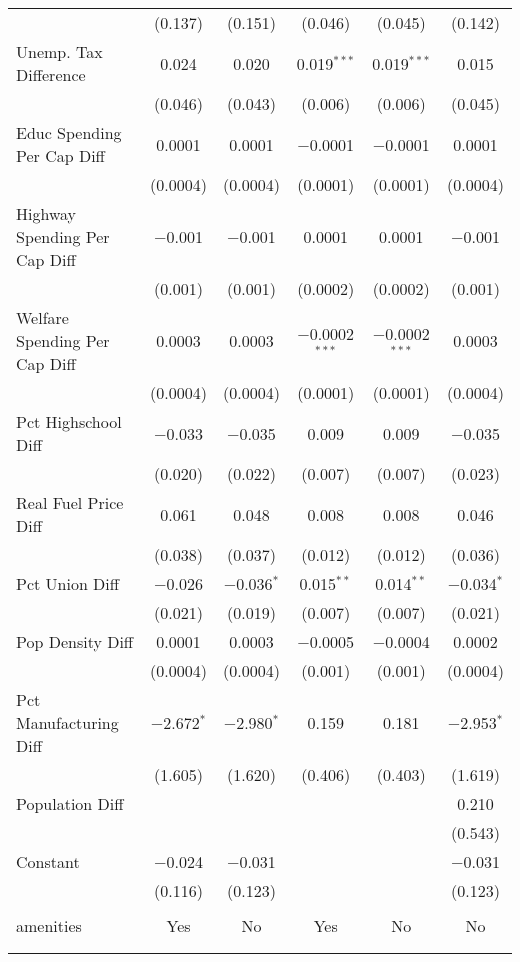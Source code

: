 \begin{table}[!htbp]
\begin{tabular}{@{\extracolsep{5pt}}lccccc}
  & (0.137) & (0.151) & (0.046) & (0.045) & (0.142) \\ 
  Unemp. Tax Difference & 0.024 & 0.020 & 0.019$^{***}$ & 0.019$^{***}$ & 0.015 \\ 
  & (0.046) & (0.043) & (0.006) & (0.006) & (0.045) \\ 
  Educ Spending Per Cap Diff & 0.0001 & 0.0001 & $-$0.0001 & $-$0.0001 & 0.0001 \\ 
  & (0.0004) & (0.0004) & (0.0001) & (0.0001) & (0.0004) \\ 
  Highway Spending Per Cap Diff & $-$0.001 & $-$0.001 & 0.0001 & 0.0001 & $-$0.001 \\ 
  & (0.001) & (0.001) & (0.0002) & (0.0002) & (0.001) \\ 
  Welfare Spending Per Cap Diff & 0.0003 & 0.0003 & $-$0.0002$^{***}$ & $-$0.0002$^{***}$ & 0.0003 \\ 
  & (0.0004) & (0.0004) & (0.0001) & (0.0001) & (0.0004) \\ 
  Pct Highschool Diff & $-$0.033 & $-$0.035 & 0.009 & 0.009 & $-$0.035 \\ 
  & (0.020) & (0.022) & (0.007) & (0.007) & (0.023) \\ 
  Real Fuel Price Diff & 0.061 & 0.048 & 0.008 & 0.008 & 0.046 \\ 
  & (0.038) & (0.037) & (0.012) & (0.012) & (0.036) \\ 
  Pct Union Diff & $-$0.026 & $-$0.036$^{*}$ & 0.015$^{**}$ & 0.014$^{**}$ & $-$0.034$^{*}$ \\ 
  & (0.021) & (0.019) & (0.007) & (0.007) & (0.021) \\ 
  Pop Density Diff & 0.0001 & 0.0003 & $-$0.0005 & $-$0.0004 & 0.0002 \\ 
  & (0.0004) & (0.0004) & (0.001) & (0.001) & (0.0004) \\ 
  Pct Manufacturing Diff & $-$2.672$^{*}$ & $-$2.980$^{*}$ & 0.159 & 0.181 & $-$2.953$^{*}$ \\ 
  & (1.605) & (1.620) & (0.406) & (0.403) & (1.619) \\ 
  Population Diff &  &  &  &  & 0.210 \\ 
  &  &  &  &  & (0.543) \\ 
  Constant & $-$0.024 & $-$0.031 &  &  & $-$0.031 \\ 
  & (0.116) & (0.123) &  &  & (0.123) \\ 
 \hline \\[-1.8ex] 
amenities & Yes & No & Yes & No & No \\ 
\hline \\[-1.8ex] 
\hline 
\hline \\[-1.8ex] 
\end{tabular} 
\end{table} 
